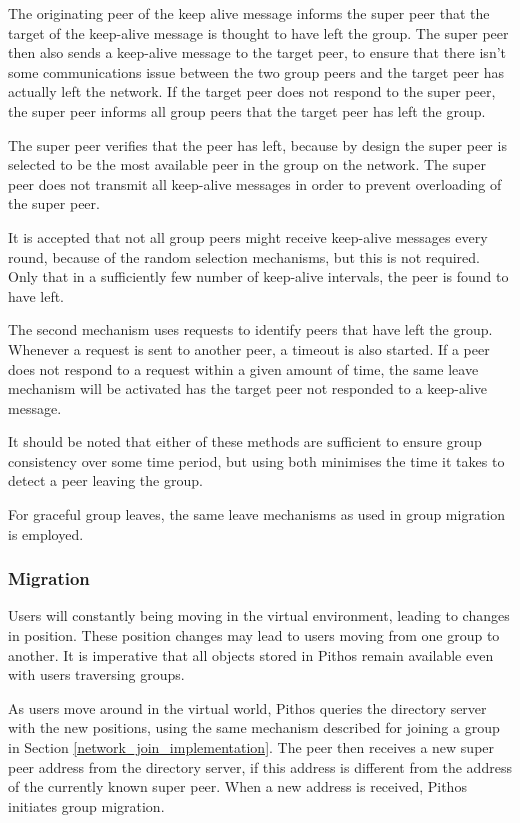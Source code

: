 The originating peer of the keep alive message informs the super peer that the target of the keep-alive message is thought to have left the group. The super peer then also sends a keep-alive message to the target peer, to ensure that there isn't some communications issue between the two group peers and the target peer has actually left the network. If the target peer does not respond to the super peer, the super peer informs all group peers that the target peer has left the group.

The super peer verifies that the peer has left, because by design the super peer is selected to be the most available peer in the group on the network. The super peer does not transmit all keep-alive messages in order to prevent overloading of the super peer.

It is accepted that not all group peers might receive keep-alive messages every round, because of the random selection mechanisms, but this is not required. Only that in a sufficiently few number of keep-alive intervals, the peer is found to have left.

The second mechanism uses requests to identify peers that have left the group. Whenever a request is sent to another peer, a timeout is also started. If a peer does not respond to a request within a given amount of time, the same leave mechanism will be activated has the target peer not responded to a keep-alive message.

It should be noted that either of these methods are sufficient to ensure group consistency over some time period, but using both minimises the time it takes to detect a peer leaving the group.

For graceful group leaves, the same leave mechanisms as used in group migration is employed.

\subsubsection{Migration}
\label{migration_design}

Users will constantly being moving in the virtual environment, leading to changes in position. These position changes may lead to users moving from one group to another. It is imperative that all objects stored in Pithos remain available even with users traversing groups.

As users move around in the virtual world, Pithos queries the directory server with the new positions, using the same mechanism described for joining a group in Section \ref{network_join_implementation}. The peer then receives a new super peer address from the directory server, if this address is different from the address of the currently known super peer. When a new address is received, Pithos initiates group migration.

